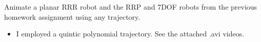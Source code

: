 \documentclass[12pt]{article}
\newenvironment{Problem}[2][Problem]{\begin{trivlist}
\item[\hskip \labelsep {\bfseries #1}\hskip \labelsep {\bfseries #2.}]}{\end{trivlist}}
\newenvironment{Solution}[2][Solution]{\begin{trivlist}
\item[\hskip \labelsep {\bfseries #1}\hskip \labelsep {\bfseries #2}]}{\end{trivlist}}
\begin{document}
\pagebreak

\begin{Problem}{3}
Animate a planar RRR robot and the RRP and 7DOF robots from the previous homework assignment using any trajectory.

\begin{Solution}{}
\end{Solution}

\begin{itemize}
\item I employed a quintic polynomial trajectory. See the attached .avi videos.
\end{itemize}

\end{Problem}



 
 
\end{document}
